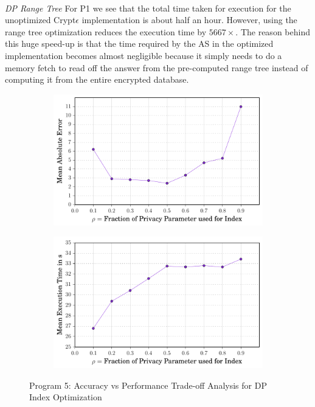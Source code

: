 \\
\textit{DP Range Tree}
 For P1 we see that the total time taken for execution for the unoptimized Crypt$\epsilon$ implementation is about half an hour. However, using the range tree optimization reduces the execution time by $5667\times$. The reason behind this huge speed-up is that the time required by the \textsf{AS} in the optimized implementation becomes almost negligible because it simply needs to do a memory fetch to read off the answer from the pre-computed range tree instead of computing it from the entire encrypted database. 
 \begin{figure}[ht]
   \begin{subfigure}[b]{0.45\linewidth}
    \centering \includegraphics[width=1\linewidth]{index_error.pdf}
        \caption{}
        \label{fig:error}\end{subfigure}
        \begin{subfigure}[b]{0.45\linewidth}
        \includegraphics[width=1\linewidth]{index_time.pdf}
        \caption{}
        \label{fig:time}
        \end{subfigure}
        \caption{Program 5: Accuracy vs Performance Trade-off Analysis for DP Index Optimization }\label{index}
    \end{figure}
